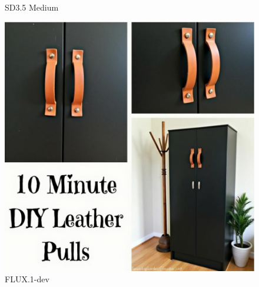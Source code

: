 \documentclass{article}
\begin{document}
\begin{figure}[H]
\begin{minipage}{0.3\textwidth}
		\caption{SD3.5 Medium}
		\label{sd3.5}
	\end{minipage}
	\hfill
	\begin{minipage}{0.3\textwidth}
		\centering
		\includegraphics[width=\textwidth]{fluxleather.png}
		\caption{FLUX.1-dev}
		\label{flux}
	\end{minipage}
\end{figure}





\end{document}
